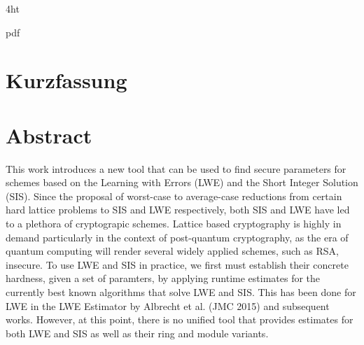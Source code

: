 \documentclass[
  a4paper,  %
  twoside,  %
  bibliography=totoc,
  headsepline,
  cleardoublepage=empty,
  parskip=half,
  draft=false
]{scrbook}
\begin{document}
\iftex4ht

  {pdf}
  {%
  }
\fi



\Titelblatt

\pagestyle{preamble}
\renewcommand*{\chapterpagestyle}{preamble}



\ifdeutsch
  \section*{Kurzfassung}
\else
  \section*{Abstract}
\fi

This work introduces a new tool that can be used to find secure parameters for schemes based on the Learning with Errors (LWE) and the Short Integer Solution (SIS). Since the proposal of worst-case to average-case reductions from certain hard lattice problems to SIS and LWE respectively, both SIS and LWE have led to a plethora of cryptograpic schemes. Lattice based cryptography is highly in demand particularly in the context of post-quantum cryptography, as the era of quantum computing will render several widely applied schemes, such as RSA, insecure. To use LWE and SIS in practice, we first must establish their concrete hardness, given a set of paramters, by applying runtime estimates for the currently best known algorithms that solve LWE and SIS. This has been done for LWE in the LWE Estimator by Albrecht et al. (JMC 2015) and subsequent works. However, at this point, there is no unified tool that provides estimates for both LWE and SIS as well as their ring and module variants.
\end{document}
